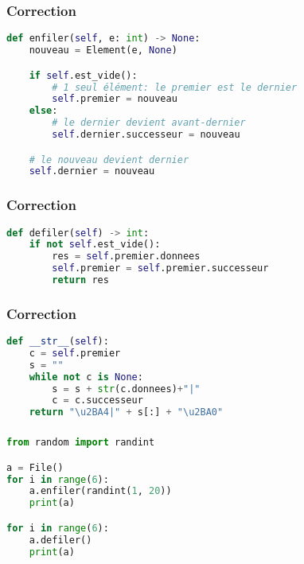 \documentclass[svgnames,11pt]{beamer}
\begin{document}
\begin{frame}[fragile]
    \frametitle{Correction}

\begin{lstlisting}[language=Python , basicstyle=\ttfamily\small, xleftmargin=2em, xrightmargin=2em]
def enfiler(self, e: int) -> None:
    nouveau = Element(e, None)

    if self.est_vide():
        # 1 seul élément: le premier est le dernier
        self.premier = nouveau
    else:
        # le dernier devient avant-dernier
        self.dernier.successeur = nouveau

    # le nouveau devient dernier
    self.dernier = nouveau
\end{lstlisting}

\end{frame}
\begin{frame}[fragile]
    \frametitle{Correction}

\begin{lstlisting}[language=Python , basicstyle=\ttfamily\small, xleftmargin=1em, xrightmargin=1em]
def defiler(self) -> int:
    if not self.est_vide():
        res = self.premier.donnees
        self.premier = self.premier.successeur
        return res
\end{lstlisting}

\end{frame}
\begin{frame}[fragile]
    \frametitle{Correction}

\begin{lstlisting}[language=Python , basicstyle=\ttfamily\small, xleftmargin=2em, xrightmargin=2em]
def __str__(self):
    c = self.premier
    s = ""
    while not c is None:
        s = s + str(c.donnees)+"|"
        c = c.successeur
    return "\u2BA4|" + s[:] + "\u2BA0"
\end{lstlisting}

\end{frame}
\begin{frame}[fragile]
    \frametitle{}
    \begin{center}
\begin{lstlisting}[language=Python , basicstyle=\ttfamily\small, xleftmargin=2em, xrightmargin=2em]
from random import randint

a = File()
for i in range(6):
    a.enfiler(randint(1, 20))
    print(a)

for i in range(6):
    a.defiler()
    print(a)
\end{lstlisting} 
    \label{CODE}
    \end{center}  

\end{frame}
\end{document}
